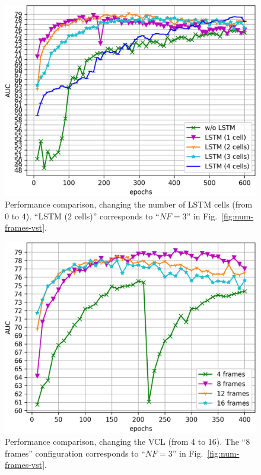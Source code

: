\begin{figure}[ht!]
\centerline{\includegraphics[clip,width=\figsize]{images/exp_2.jpg}}
	\caption{Performance comparison, changing the number of LSTM cells (from 0 to 4). ``LSTM (2 cells)'' corresponds to ``$\mathit{NF}=3$''  in Fig.~\ref{fig:num-frames-vst}.}
	\label{fig:num-memory-cells}
\end{figure}


\begin{figure}[ht!]
\centerline{\includegraphics[clip,width=\figsize]{images/exp_3.jpg}}
    \caption{Performance comparison, changing the VCL (from 4 to 16). The ``8 frames'' configuration corresponds to ``$\mathit{NF}=3$'' in Fig.~\ref{fig:num-frames-vst}.\label{fig:random-batch}}
\end{figure}

